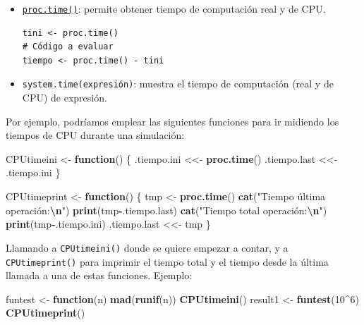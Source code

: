 \documentclass[
  spanish,
  10pt,
]{book}
\newenvironment{Shaded}{\begin{snugshade}}{\end{snugshade}}
\newcommand{\ControlFlowTok}[1]{\textcolor[rgb]{0.13,0.29,0.53}{\textbf{#1}}}
\newcommand{\DecValTok}[1]{\textcolor[rgb]{0.00,0.00,0.81}{#1}}
\newcommand{\FunctionTok}[1]{\textcolor[rgb]{0.13,0.29,0.53}{\textbf{#1}}}
\newcommand{\NormalTok}[1]{#1}
\newcommand{\OtherTok}[1]{\textcolor[rgb]{0.56,0.35,0.01}{#1}}
\newcommand{\SpecialCharTok}[1]{\textcolor[rgb]{0.81,0.36,0.00}{\textbf{#1}}}
\newcommand{\StringTok}[1]{\textcolor[rgb]{0.31,0.60,0.02}{#1}}
\theoremstyle{break}
\theoremstyle{nonumberplain}
\begin{document}
\begin{itemize}
\item
  \href{https://rdrr.io/r/base/proc.time.html}{\texttt{proc.time()}}: permite obtener tiempo de computación real
  y de CPU.

\begin{verbatim}
tini <- proc.time()
# Código a evaluar
tiempo <- proc.time() - tini
\end{verbatim}
\item
  \texttt{system.time(expresión)}: muestra el tiempo de computación (real y
  de CPU) de expresión.
\end{itemize}

Por ejemplo, podríamos emplear las siguientes funciones para ir midiendo los tiempos de CPU durante una simulación:

\begin{Shaded}
\begin{Highlighting}[]
\NormalTok{CPUtimeini }\OtherTok{\textless{}{-}} \ControlFlowTok{function}\NormalTok{() \{}
\NormalTok{  .tiempo.ini }\OtherTok{\textless{}\textless{}{-}} \FunctionTok{proc.time}\NormalTok{()}
\NormalTok{  .tiempo.last }\OtherTok{\textless{}\textless{}{-}}\NormalTok{ .tiempo.ini}
\NormalTok{\}}

\NormalTok{CPUtimeprint }\OtherTok{\textless{}{-}} \ControlFlowTok{function}\NormalTok{() \{}
\NormalTok{  tmp }\OtherTok{\textless{}{-}} \FunctionTok{proc.time}\NormalTok{()}
  \FunctionTok{cat}\NormalTok{(}\StringTok{"Tiempo última operación:}\SpecialCharTok{\textbackslash{}n}\StringTok{"}\NormalTok{)}
  \FunctionTok{print}\NormalTok{(tmp}\SpecialCharTok{{-}}\NormalTok{.tiempo.last)}
  \FunctionTok{cat}\NormalTok{(}\StringTok{"Tiempo total operación:}\SpecialCharTok{\textbackslash{}n}\StringTok{"}\NormalTok{)}
  \FunctionTok{print}\NormalTok{(tmp}\SpecialCharTok{{-}}\NormalTok{.tiempo.ini)}
\NormalTok{  .tiempo.last }\OtherTok{\textless{}\textless{}{-}}\NormalTok{ tmp}
\NormalTok{\}}
\end{Highlighting}
\end{Shaded}

Llamando a \texttt{CPUtimeini()} donde se quiere empezar a contar, y a \texttt{CPUtimeprint()} para imprimir el tiempo total y el tiempo desde la última llamada a una de estas funciones.
Ejemplo:

\begin{Shaded}
\begin{Highlighting}[]
\NormalTok{funtest }\OtherTok{\textless{}{-}} \ControlFlowTok{function}\NormalTok{(n) }\FunctionTok{mad}\NormalTok{(}\FunctionTok{runif}\NormalTok{(n)) }
\FunctionTok{CPUtimeini}\NormalTok{()}
\NormalTok{result1 }\OtherTok{\textless{}{-}} \FunctionTok{funtest}\NormalTok{(}\DecValTok{10}\SpecialCharTok{\^{}}\DecValTok{6}\NormalTok{)}
\FunctionTok{CPUtimeprint}\NormalTok{()}
\end{Highlighting}
\end{Shaded}
\end{document}
